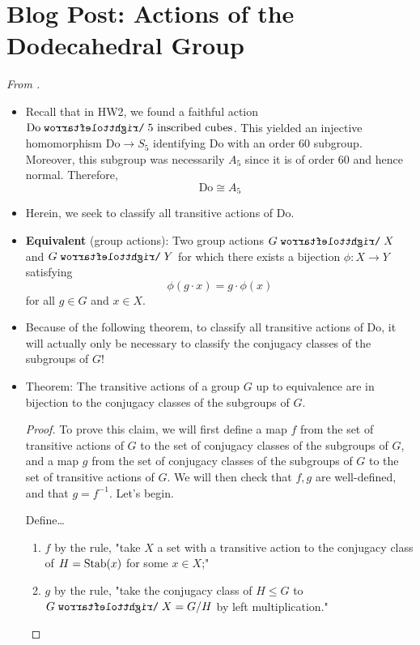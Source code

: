 \documentclass[../notes.tex]{subfiles}
\begin{document}
\section{Blog Post: Actions of the Dodecahedral Group}
\emph{From \textcite{bib:Calegari}.}
\begin{itemize}
    \item {}Recall that in HW2, we found a faithful action $\text{Do}\acts\text{5 inscribed cubes}$. This yielded an injective homomorphism $\text{Do}\to S_5$ identifying $\text{Do}$ with an order 60 subgroup. Moreover, this subgroup was necessarily $A_5$ since it is of order 60 and hence normal. Therefore,
    \begin{equation*}
        \text{Do} \cong A_5
    \end{equation*}
    \item Herein, we seek to classify all transitive actions of $\text{Do}$.
    \item \textbf{Equivalent} (group actions): Two group actions $G\acts X$ and $G\acts Y$ for which there exists a bijection $\phi:X\to Y$ satisfying
    \begin{equation*}
        \phi(g\cdot x) = g\cdot\phi(x)
    \end{equation*}
    for all $g\in G$ and $x\in X$.
    \item Because of the following theorem, to classify all transitive actions of $\text{Do}$, it will actually only be necessary to classify the conjugacy classes of the subgroups of $G$!
    \item Theorem: The transitive actions of a group $G$ up to equivalence are in bijection to the conjugacy classes of the subgroups of $G$.
    \begin{proof}
        To prove this claim, we will first define a map $f$ from the set of transitive actions of $G$ to the set of conjugacy classes of the subgroups of $G$, and a map $g$ from the set of conjugacy classes of the subgroups of $G$ to the set of transitive actions of $G$. We will then check that $f,g$ are well-defined, and that $g=f^{-1}$. Let's begin.\par
        Define\dots
        \begin{enumerate}
            \item $f$ by the rule, "take $X$ a set with a transitive action to the conjugacy class of $H=\operatorname{Stab}(x)$ for some $x\in X$;"
            \item $g$ by the rule, "take the conjugacy class of $H\leq G$ to $G\acts X=G/H$ by left multiplication."

\end{enumerate}
\end{proof}
\end{itemize}
\end{document}
